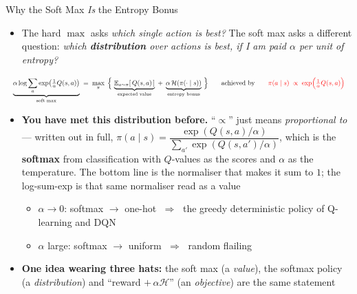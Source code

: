 \begin{frame}{Why the Soft Max \emph{Is} the Entropy Bonus}
\small
\begin{itemize}
    \item The hard $\max$ asks \emph{which single action is best?} The soft max asks a different question: \emph{which \textbf{distribution} over actions is best, if I am paid $\alpha$ per unit of entropy?}
\end{itemize}
\vspace{-0.2em}
\[
\resizebox{\linewidth}{!}{$\displaystyle
\underbrace{\alpha\log\sum_a \exp\!\big(\tfrac1\alpha Q(s,a)\big)}_{\text{soft max}}
\;=\;
\max_{\pi}\;\Big\{\, \underbrace{\mathbb{E}_{a\sim\pi}[\,Q(s,a)\,]}_{\text{expected value}} \;+\; \underbrace{\alpha\,\mathcal{H}(\pi(\cdot\mid s))}_{\text{entropy bonus}} \,\Big\}
\qquad\text{achieved by}\qquad
\textcolor{red}{\pi(a\mid s) \;\propto\; \exp\!\Big(\tfrac{1}{\alpha}Q(s,a)\Big)}
$}
\]
\begin{itemize}
    \item \textbf{You have met this distribution before.} ``$\propto$'' just means \emph{proportional to} --- written out in full, $\pi(a\mid s)=\dfrac{\exp(Q(s,a)/\alpha)}{\sum_{a'}\exp(Q(s,a')/\alpha)}$, which is the \textbf{softmax} from classification with $Q$-values as the scores and $\alpha$ as the temperature. The bottom line is the normaliser that makes it sum to $1$; the log-sum-exp is that same normaliser read as a value
    \begin{itemize}
        \item $\alpha \to 0$: softmax $\to$ one-hot $\;\Rightarrow\;$ the greedy deterministic policy of Q-learning and DQN
        \item $\alpha$ large: softmax $\to$ uniform $\;\Rightarrow\;$ random flailing
    \end{itemize}
    \item[$\Rightarrow$] \textbf{One idea wearing three hats:} the soft max (a \emph{value}), the softmax policy (a \emph{distribution}) and ``reward $+\,\alpha\mathcal{H}$'' (an \emph{objective}) are the same statement
\end{itemize}
\end{frame}

